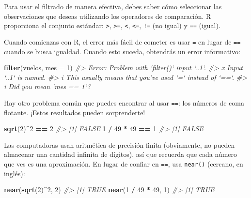 \documentclass[11pt,oneside]{report}
\newenvironment{Shaded}{\begin{snugshade}}{\end{snugshade}}
\newcommand{\CommentTok}[1]{\textcolor[rgb]{0.56,0.35,0.01}{\textit{#1}}}
\newcommand{\DataTypeTok}[1]{\textcolor[rgb]{0.13,0.29,0.53}{#1}}
\newcommand{\DecValTok}[1]{\textcolor[rgb]{0.00,0.00,0.81}{#1}}
\newcommand{\KeywordTok}[1]{\textcolor[rgb]{0.13,0.29,0.53}{\textbf{#1}}}
\newcommand{\NormalTok}[1]{#1}
\newcommand{\OperatorTok}[1]{\textcolor[rgb]{0.81,0.36,0.00}{\textbf{#1}}}
\newcommand{\StringTok}[1]{\textcolor[rgb]{0.31,0.60,0.02}{#1}}
\begin{document}
Para usar el filtrado de manera efectiva, debes saber cómo seleccionar
las observaciones que deseas utilizando los operadores de comparación. R
proporciona el conjunto estándar: \texttt{\textgreater{}},
\texttt{\textgreater{}=}, \texttt{\textless{}}, \texttt{\textless{}=},
\texttt{!=} (no igual) y \texttt{==} (igual).

Cuando comienzas con R, el error más fácil de cometer es usar \texttt{=}
en lugar de \texttt{==} cuando se busca igualdad. Cuando esto suceda,
obtendrás un error informativo:

\begin{Shaded}
\begin{Highlighting}[]
\KeywordTok{filter}\NormalTok{(vuelos, }\DataTypeTok{mes =} \DecValTok{1}\NormalTok{)}
\CommentTok{#> Error: Problem with `filter()` input `..1`.}
\CommentTok{#> x Input `..1` is named.}
\CommentTok{#> i This usually means that you've used `=` instead of `==`.}
\CommentTok{#> i Did you mean `mes == 1`?}
\end{Highlighting}
\end{Shaded}

Hay otro problema común que puedes encontrar al usar \texttt{==}: los
números de coma flotante. ¡Estos resultados pueden sorprenderte!

\begin{Shaded}
\begin{Highlighting}[]
\KeywordTok{sqrt}\NormalTok{(}\DecValTok{2}\NormalTok{)}\OperatorTok{^}\DecValTok{2} \OperatorTok{==}\StringTok{ }\DecValTok{2}
\CommentTok{#> [1] FALSE}
\DecValTok{1} \OperatorTok{/}\StringTok{ }\DecValTok{49} \OperatorTok{*}\StringTok{ }\DecValTok{49} \OperatorTok{==}\StringTok{ }\DecValTok{1}
\CommentTok{#> [1] FALSE}
\end{Highlighting}
\end{Shaded}

Las computadoras usan aritmética de precisión finita (obviamente, no
pueden almacenar una cantidad infinita de dígitos), así que recuerda que
cada número que ves es una aproximación. En lugar de confiar en
\texttt{==}, usa \texttt{near()} (cercano, en inglés):

\begin{Shaded}
\begin{Highlighting}[]
\KeywordTok{near}\NormalTok{(}\KeywordTok{sqrt}\NormalTok{(}\DecValTok{2}\NormalTok{)}\OperatorTok{^}\DecValTok{2}\NormalTok{, }\DecValTok{2}\NormalTok{)}
\CommentTok{#> [1] TRUE}
\KeywordTok{near}\NormalTok{(}\DecValTok{1} \OperatorTok{/}\StringTok{ }\DecValTok{49} \OperatorTok{*}\StringTok{ }\DecValTok{49}\NormalTok{, }\DecValTok{1}\NormalTok{)}
\CommentTok{#> [1] TRUE}
\end{Highlighting}
\end{Shaded}
\end{document}
